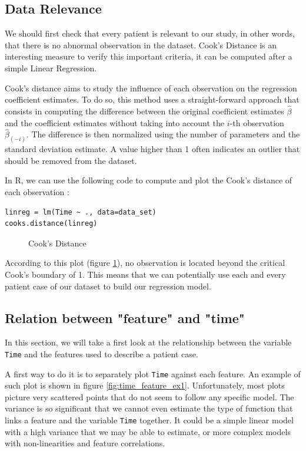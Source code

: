 \documentclass[]{report}
\newcommand{\inputtikz}[2]{%
	\scalebox{#1}{}  
}
\begin{document}
\subsection{Data Relevance}
We should first check that every patient is relevant to our study, in other words, that there is no abnormal observation in the dataset. Cook's Distance is an interesting measure to verify this important criteria, it can be computed after a simple Linear Regression.

Cook's distance aims to study the influence of each observation on the regression coefficient estimates. To do so, this method uses a straight-forward approach that consists in computing the difference between the original coefficient estimates $\hat{\beta}$ and the coefficient estimates without taking into account the $i$-th observation $\hat{\beta}_{(-i)}$. The difference is then normalized using the number of parameters and the standard deviation estimate. A value higher than 1 often indicates an outlier that should be removed from the dataset.

In R, we can use the following code to compute and plot the Cook's distance of each observation :

\begin{lstlisting}
linreg = lm(Time ~ ., data=data_set)
cooks.distance(linreg)
\end{lstlisting} 

\begin{figure}[!h]
	\centering
	\inputtikz{0.5}{Figures/cooks_distance.tex}
	\caption{Cook's Distance}
	\label{fig:cook_distance}
\end{figure}

According to this plot (figure \ref{fig:cook_distance}), no observation is located beyond the critical Cook's boundary of 1. This means that we can potentially use each and every patient case of our dataset to build our regression model. 

\subsection{Relation between "feature" and "time"}
In this section, we will take a first look at the relationship between the variable \texttt{Time} and the features used to describe a patient case. 

A first way to do it is to separately plot \texttt{Time} against each feature. An example of such plot is shown in figure \ref{fig:time_feature_ex1}. Unfortunately, most plots picture very scattered points that do not seem to follow any specific model. The variance is so significant that we cannot even estimate the type of function that links a feature and the variable \texttt{Time} together. It could be a simple linear model with a high variance that we may be able to estimate, or more complex models with non-linearities and feature correlations.
\end{document}
